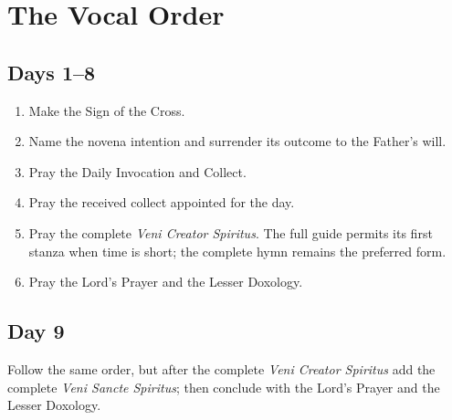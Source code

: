 
\section{The Vocal Order}


\subsection{Days 1--8}

\begin{enumerate}
\item Make the Sign of the Cross.
\item Name the novena intention and surrender its outcome to the Father's will.
\item Pray the Daily Invocation and Collect.
\item Pray the received collect appointed for the day.
\item Pray the complete \textit{Veni Creator Spiritus}. The full guide permits its first stanza when time is short; the complete hymn remains the preferred form.
\item Pray the Lord's Prayer and the Lesser Doxology.
\end{enumerate}

\subsection{Day 9}

Follow the same order, but after the complete \textit{Veni Creator Spiritus} add the complete \textit{Veni Sancte Spiritus}; then conclude with the Lord's Prayer and the Lesser Doxology.

